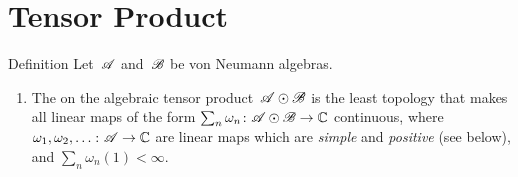 \documentclass[a]{subfiles}
\begin{document}
\section{Tensor Product}
\begin{parsec}%
\begin{point}{Definition}%
Let~$\mathscr{A}$ and~$\mathscr{B}$ be von Neumann algebras.
\begin{enumerate}
\item
The 
on the algebraic tensor product~$\mathscr{A}\odot\mathscr{B}$
is the least topology that makes
all linear maps of the form $\sum_n \omega_n
\colon \mathscr{A} \odot \mathscr{B}\to\mathbb{C}$
continuous,
where $\omega_1,\omega_2,\dotsc \colon \mathscr{A}\to \mathbb{C}$
are linear maps which
are \emph{simple} and \emph{positive} (see below),
and $\sum_n \omega_n(1) <\infty$.


\end{enumerate}
\end{point}
\end{parsec}
\end{document}
